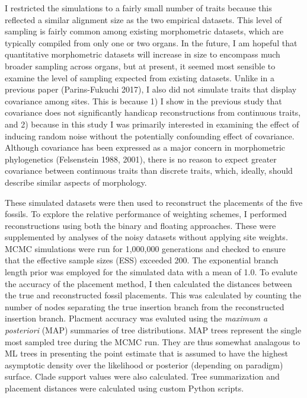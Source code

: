 \documentclass[12pt]{article}
\begin{document}
I restricted the simulations to a fairly small number of traits because
this reflected a similar alignment size as the two empirical datasets.
This level of sampling is fairly common among existing morphometric
datasets, which are typically compiled from only one or two organs. In
the future, I am hopeful that quantitative morphometric datasets will
increase in size to encompass much broader sampling across organs, but
at present, it seemed most sensible to examine the level of sampling
expected from existing datasets. Unlike in a previous paper
(Parins-Fukuchi 2017), I also did not simulate traits that display
covariance among sites. This is because 1) I show in the previous study
that covariance does not significantly handicap reconstructions from
continuous traits, and 2) because in this study I was primarily
interested in examining the effect of inducing random noise without the
potentially confounding effect of covariance. Although covariance has
been expressed as a major concern in morphometric phylogenetics
(Felsenstein 1988, 2001), there is no reason to expect greater
covariance between continuous traits than discrete traits, which,
ideally, should describe similar aspects of morphology.

These simulated datasets were then used to reconstruct the placements of
the five fossils. To explore the relative performance of weighting
schemes, I performed reconstructions using both the binary and floating
approaches. These were supplemented by analyses of the noisy datasets
without applying site weights. MCMC simulations were run for 1,000,000
generations and checked to ensure that the effective sample sizes (ESS)
exceeded 200. The exponential branch length prior was employed for the
simulated data with a mean of 1.0. To evalute the accuracy of the
placement method, I then calculated the distances between the true and
reconstructed fossil placements. This was calculated by counting the
number of nodes separating the true insertion branch from the
reconstructed insertion branch. Placment accuracy was evaluted using the
\emph{maximum a posteriori} (MAP) summaries of tree distributions. MAP
trees represent the single most sampled tree during the MCMC run. They
are thus somewhat analagous to ML trees in presenting the point estimate
that is assumed to have the highest asymptotic density over the
likelihood or posterior (depending on paradigm) surface. Clade support
values were also calculated. Tree summarization and placement distances
were calculated using custom Python scripts.
\end{document}
